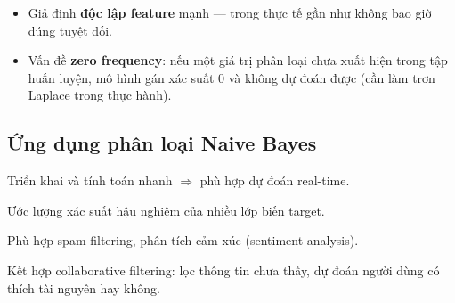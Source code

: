 \begin{luuy}[title={Nhược điểm (Cons)}]
\begin{itemize}
  \item Giả định \textbf{độc lập feature} mạnh --- trong thực tế gần như không bao giờ đúng tuyệt đối.
  \item Vấn đề \textbf{zero frequency}: nếu một giá trị phân loại chưa xuất hiện trong tập huấn luyện, mô hình gán xác suất 0 và không dự đoán được (cần làm trơn Laplace trong thực hành).
\end{itemize}
\end{luuy}

\subsection{Ứng dụng phân loại Naive Bayes}

\begin{ynghia}[title={Dự đoán thời gian thực}]
Triển khai và tính toán nhanh $\Rightarrow$ phù hợp dự đoán real-time.
\end{ynghia}

\begin{ynghia}[title={Dự đoán đa lớp}]
Ước lượng xác suất hậu nghiệm của nhiều lớp biến target.
\end{ynghia}

\begin{ynghia}[title={Phân loại văn bản}]
Phù hợp spam-filtering, phân tích cảm xúc (sentiment analysis).
\end{ynghia}

\begin{ynghia}[title={Hệ gợi ý (Recommendation system)}]
Kết hợp collaborative filtering: lọc thông tin chưa thấy, dự đoán người dùng có thích tài nguyên hay không.
\end{ynghia}
